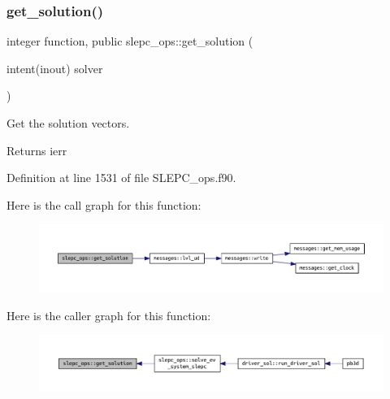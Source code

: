 \subsubsection{\texorpdfstring{get\+\_\+solution()}{get\_solution()}}
{\footnotesize\ttfamily integer function, public slepc\+\_\+ops\+::get\+\_\+solution (\begin{DoxyParamCaption}\item[{intent(inout)}]{solver }\end{DoxyParamCaption})}



Get the solution vectors. 

\begin{DoxyReturn}{Returns}
ierr 
\end{DoxyReturn}


Definition at line 1531 of file S\+L\+E\+P\+C\+\_\+ops.\+f90.

Here is the call graph for this function\+:\nopagebreak
\begin{figure}[H]
\begin{center}
\leavevmode
\includegraphics[width=350pt]{namespaceslepc__ops_aabe2aef90f039316bf3f03e651a6e7e0_cgraph}
\end{center}
\end{figure}
Here is the caller graph for this function\+:\nopagebreak
\begin{figure}[H]
\begin{center}
\leavevmode
\includegraphics[width=350pt]{namespaceslepc__ops_aabe2aef90f039316bf3f03e651a6e7e0_icgraph}
\end{center}
\end{figure}
\mbox{\label{namespaceslepc__ops_a05f8a23335ed47ad1996cddf3bcfdc2e}} 
